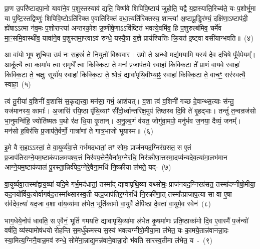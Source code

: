 प्रा॒ण उ॒परि॑ष्टादपा॒नो यावा॑ने॒व प॒शुस्तस्याव॑ द्यति॒ विष्ण॑वे शिपिवि॒ष्टाय॑ जुहोति॒ यद्वै य॒ज्ञस्या॑ति॒रिच्य॑ते॒ यः प॒शोर्भू॒मा या पुष्टि॒स्तद्विष्णुः॑ शिपिवि॒ष्टो\-ऽति॑रिक्त ए॒वाति॑रिक्तं दधा॒त्यति॑रिक्तस्य॒ शान्त्या॑ अ॒ष्टाप्रू॒ड्ढिर॑ण्यं॒ दक्षि॑णा॒\-ऽष्टाप॑दी॒ ह्ये॑षा\-ऽऽ\-\-त्मा न॑व॒मः प॒शोराप्त्या॑ अन्तरको॒श उ॒ष्णीषे॒णा\-ऽऽ\-\-वि॑ष्टितं भवत्ये॒वमि॑व॒ हि प॒शुरुल्ब॑मिव॒ चर्मे॑व मा॒ꣳ॒समि॒वास्थी॑व॒ यावा॑ने॒व प॒शुस्तमा॒प्त्वा\-ऽ\-व॑ रुन्धे॒ यस्यै॒षा य॒ज्ञे प्राय॑श्चित्तिः क्रि॒यत॑ इ॒ष्ट्वा वसी॑यान्भवति॥~(४)

{\anuvakamend[{व॒र्त॒येत्या॑ह न॒ इति॒ वै नाभ्या॒ उल्ब॑मि॒वैक॑विꣳशतिश्च}]}%

आ वा॑यो भूष शुचिपा॒ उप॑ नः स॒हस्रं॑ ते नि॒युतो॑ विश्ववार। उपो॑ ते॒ अन्धो॒ मद्य॑मयामि॒ यस्य॑ देव दधि॒षे पू᳚र्व॒पेयम्᳚। आकू᳚त्यै त्वा॒ कामा॑य त्वा स॒मृधे᳚ त्वा किक्कि॒टा ते॒ मनः॑ प्र॒जा\-प॑तये॒ स्वाहा॑ किक्कि॒टा ते᳚ प्रा॒णं वा॒यवे॒ स्वाहा॑ किक्कि॒टा ते॒ चक्षुः॒ सूर्या॑य॒ स्वाहा॑ किक्कि॒टा ते॒ श्रोत्रं॒ द्यावा॑\-पृथि॒वीभ्या॒ꣴ॒ स्वाहा॑ किक्कि॒टा ते॒ वाच॒ꣳ॒ सर॑स्वत्यै॒ स्वाहा॒~(५)

त्वं तु॒रीया॑ व॒शिनी॑ व॒शासि॑ स॒कृद्यत्त्वा॒ मन॑सा॒ गर्भ॒ आश॑यत्। व॒शा त्वं व॒शिनी॑ गच्छ दे॒वान्थ्स॒त्याः स॑न्तु॒ यज॑मानस्य॒ कामाः᳚। अ॒जासि॑ रयि॒ष्ठा पृ॑थि॒व्याꣳ सी॑दो॒र्ध्वान्तरि॑क्ष॒मुप॑ तिष्ठस्व दि॒वि ते॑ बृ॒हद्भाः। तन्तुं॑ त॒न्वन्रज॑सो भा॒नुमन्वि॑हि॒ ज्योति॑ष्मतः प॒थो र॑क्ष धि॒या कृ॒तान्। अ॒नु॒ल्ब॒णं व॑यत॒ जोगु॑वा॒मपो॒ मनु॑र्भव ज॒नया॒ दैव्यं॒ जनम्᳚। मन॑सो ह॒विर॑सि प्र॒जा\-प॑ते॒र्वर्णो॒ गात्रा॑णां ते गात्र॒भाजो॑ भूयास्म॥~(६)

{\anuvakamend[{सर॑स्वत्यै॒ स्वाहा॒ मनु॒स्त्रयो॑दश च}]}%

इ॒मे वै स॒हा\-ऽऽ\-स्तां॒ ते वा॒युर्व्य॑वा॒त्ते गर्भ॑मदधातां॒ तꣳ सोमः॒ प्राज॑नयद॒ग्निर॑ग्रसत॒ स ए॒तं प्र॒जा\-प॑तिराग्ने॒यम॒ष्टाक॑पाल\-मपश्य॒त्तं निर॑\-वप॒त्तेनै॒वैना॑म॒ग्नेरधि॒ निर॑क्रीणा॒त्तस्मा॒दप्य॑न्यदेव॒त्या॑मा॒लभ॑मान आ\-ग्ने॒य\-म॒ष्टाक॑पालं पु॒रस्ता॒न्निर्व॑पेद॒ग्ने\-रे॒वैना॒मधि॑ नि॒ष्क्रीया ल॑भते॒ यद्-~(७)

वा॒युर्व्यवा॒त्तस्मा᳚द्वाय॒व्या॑ यदि॒मे गर्भ॒मद॑धातां॒ तस्मा᳚द् द्यावा\-पृथि॒व्या॑ यथ्सोमः॒ प्राज॑नयद॒ग्निरग्र॑सत॒ तस्मा॑दग्नीषो॒मीया॒ यद॒नयो᳚र्विय॒त्योर्वागव॑द॒त्तस्मा᳚थ्सारस्व॒ती यत्प्र॒जा\-प॑तिर॒ग्नेरधि॑ नि॒र\-क्री॑णा॒त् तस्मा᳚त्प्राजाप॒त्या सा वा ए॒षा स॑र्वदेव॒त्या॑ यद॒जा व॒शा वा॑य॒व्या॑मा ल॑भेत॒ भूति॑कामो वा॒युर्वै क्षेपि॑ष्ठा दे॒वता॑ वा॒युमे॒व स्वेन॑~(८)

भाग॒धेये॒नोप॑ धावति॒ स ए॒वैनं॒ भूतिं॑ गमयति द्यावा\-पृथि॒व्या॑मा ल॑भेत कृ॒षमा॑णः प्रति॒ष्ठाका॑मो दि॒व ए॒वास्मै॑ प॒र्जन्यो॑ वर्\mbox{}षति॒ व्य॑स्यामोष॑धयो रोहन्ति स॒मर्धु॑कमस्य स॒स्यं भ॑वत्यग्नीषो॒मीया॒मा ल॑भेत॒ यः का॒मये॒तान्न॑वानन्ना॒दः स्या॒मित्य॒ग्निनै॒वान्न॒मव॑ रुन्धे॒ सोमे॑ना॒न्नाद्य॒मन्न॑वाने॒वान्ना॒दो भ॑वति सारस्व॒तीमा ल॑भेत॒ य~-~(९)

